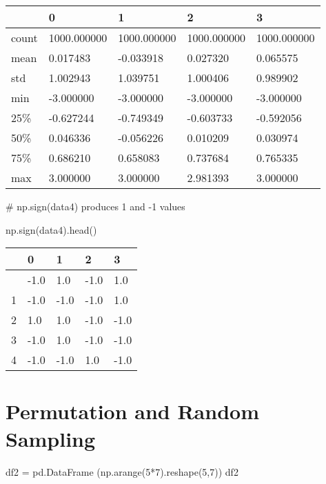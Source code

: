 \documentclass[
  letterpaper,
  DIV=11,
  numbers=noendperiod]{scrreprt}
\newenvironment{Shaded}{\begin{snugshade}}{\end{snugshade}}
\newcommand{\CommentTok}[1]{\textcolor[rgb]{0.37,0.37,0.37}{#1}}
\newcommand{\DecValTok}[1]{\textcolor[rgb]{0.68,0.00,0.00}{#1}}
\newcommand{\NormalTok}[1]{\textcolor[rgb]{0.00,0.23,0.31}{#1}}
\newcommand{\OperatorTok}[1]{\textcolor[rgb]{0.37,0.37,0.37}{#1}}
\begin{document}
\begin{longtable}[]{@{}lllll@{}}
\toprule\noalign{}
& 0 & 1 & 2 & 3 \\
\midrule\noalign{}
\endhead
\bottomrule\noalign{}
\endlastfoot
count & 1000.000000 & 1000.000000 & 1000.000000 & 1000.000000 \\
mean & 0.017483 & -0.033918 & 0.027320 & 0.065575 \\
std & 1.002943 & 1.039751 & 1.000406 & 0.989902 \\
min & -3.000000 & -3.000000 & -3.000000 & -3.000000 \\
25\% & -0.627244 & -0.749349 & -0.603733 & -0.592056 \\
50\% & 0.046336 & -0.056226 & 0.010209 & 0.030974 \\
75\% & 0.686210 & 0.658083 & 0.737684 & 0.765335 \\
max & 3.000000 & 3.000000 & 2.981393 & 3.000000 \\
\end{longtable}

\begin{Shaded}
\begin{Highlighting}[]
\CommentTok{\# np.sign(data4) produces 1 and {-}1 values}

\NormalTok{np.sign(data4).head()}
\end{Highlighting}
\end{Shaded}

\begin{longtable}[]{@{}lllll@{}}
\toprule\noalign{}
& 0 & 1 & 2 & 3 \\
\midrule\noalign{}
\endhead
\bottomrule\noalign{}
\endlastfoot
0 & -1.0 & 1.0 & -1.0 & 1.0 \\
1 & -1.0 & -1.0 & -1.0 & 1.0 \\
2 & 1.0 & 1.0 & -1.0 & -1.0 \\
3 & -1.0 & 1.0 & -1.0 & -1.0 \\
4 & -1.0 & -1.0 & 1.0 & -1.0 \\
\end{longtable}

\hypertarget{permutation-and-random-sampling}{%
\section{Permutation and Random
Sampling}\label{permutation-and-random-sampling}}

\begin{Shaded}
\begin{Highlighting}[]
\NormalTok{df2 }\OperatorTok{=}\NormalTok{ pd.DataFrame (np.arange(}\DecValTok{5}\OperatorTok{*}\DecValTok{7}\NormalTok{).reshape(}\DecValTok{5}\NormalTok{,}\DecValTok{7}\NormalTok{))}
\NormalTok{df2}
\end{Highlighting}
\end{Shaded}
\end{document}
